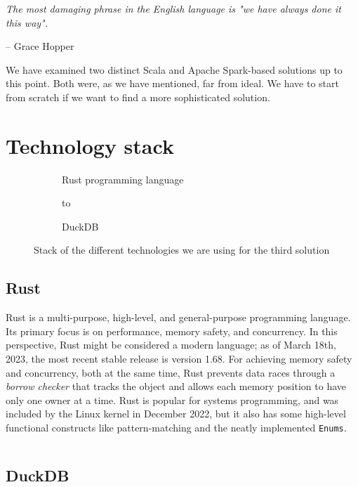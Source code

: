 \epigraph{\textit{The most damaging phrase in the English language is "we have always done it this way".}}{-- \textup{Grace Hopper}}

We have examined two distinct Scala and Apache Spark-based solutions up to this point. Both were, as we have mentioned, far from ideal. We have to start from scratch if we want to find a more sophisticated solution.

\section{Technology stack}

\begin{figure}[ht]
    \newsavebox\mybox

    \begin{subfigure}{.45\textwidth}
        \centering
        \usebox{\mybox}
        \caption{Rust programming language}
    \end{subfigure}%
    \hspace*{0.5em}
    \begin{subfigure}{.45\textwidth}
        \centering
        \vbox to \ht{}
        \caption{DuckDB}
    \end{subfigure}%
    \caption{Stack of the different technologies we are using for the third solution}
\end{figure}

\subsection{Rust}

Rust is a multi-purpose, high-level, and general-purpose programming language. Its primary focus is on performance, memory safety, and concurrency. In this perspective, Rust might be considered a modern language; as of March 18th, 2023, the most recent stable release is version 1.68. For achieving memory safety and concurrency, both at the same time, Rust prevents data races through a \textit{borrow checker} that tracks the object and allows each memory position to have only one owner at a time. Rust is popular for systems programming, and was included by the Linux kernel in December 2022, but it also has some high-level functional constructs like pattern-matching and the neatly implemented \texttt{Enums}.

\begin{code}
    \inputminted{rust}{code/listings/9-1_helloWorld.rs}
\end{code}

\subsection{DuckDB}